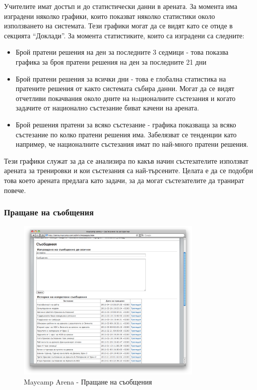 \documentclass[a4paper,12pt]{article}
\begin{document}
  Учителите имат достъп и до статистически данни в арената. За момента има изградени няколко графики, които показват няколко статистики около използването на системата. Тези графики могат да се видят като се отиде в секцията ``Доклади''. За момента статистиките, които са изградени са следните:
  
  \begin{itemize}
    \item Брой пратени решения на ден за последните 3 седмици - това показва графика за броя пратени решения на ден за последните 21 дни
    \item Брой пратени решения за всички дни - това е глобална статистика на пратените решения от както системата събира данни. Могат да се видят отчетливи покачвания около дните на нaционалните състезания и когато задачите от национално състезание биват качени на арената.
    \item Брой решения пратени за всяко състезание - графика показваща за всяко състезание по колко пратени решения има. Забелязват се тенденции като например, че националните състезания имат по най-много пратени решения.
  \end{itemize}
  
  Тези графики служат за да се анализира по какъв начин състезателите използват арената за тренировки и кои състезания са най-търсените. Целата е да се подобри това което арената предлага като задачи, за да могат състезателите да транират повече.
  
  \subsubsection{Пращане на съобщения}

  \begin{figure}[ht]
    \begin{center}
      \includegraphics[width=0.8\textwidth]{maycamp_arena_messages.png}
    \end{center}
    \caption{Maycamp Arena - Пращане на съобщения}
    \label{arena_messages}
  \end{figure}
  
\end{document}
